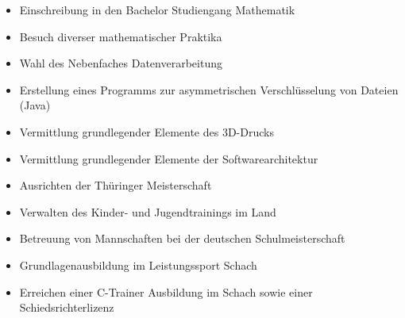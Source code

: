 \documentclass[10pt,a4paper,ragged2e,withhyper]{altacv}
\begin{document}
\begin{paracol}{2}


\begin{itemize}
\item Einschreibung in den Bachelor Studiengang Mathematik
\item Besuch diverser mathematischer Praktika
\end{itemize}


\divider

\begin{itemize}
\item Wahl des Nebenfaches Datenverarbeitung
\item Erstellung eines Programms zur asymmetrischen Verschlüsselung von
Dateien (Java)
\item Vermittlung grundlegender Elemente des 3D-Drucks
\item Vermittlung grundlegender Elemente der Softwarearchitektur
\end{itemize}

\divider

\begin{itemize}
\item Ausrichten der Thüringer Meisterschaft
\item Verwalten des Kinder- und Jugendtrainings im Land

\end{itemize}

\divider

\begin{itemize}
\item Betreuung von Mannschaften bei der deutschen Schulmeisterschaft
\item Grundlagenausbildung im Leistungssport Schach
\item Erreichen einer C-Trainer Ausbildung im Schach sowie einer\\ \mbox{Schiedsrichterlizenz}
\end{itemize}


\end{paracol}
\end{document}
